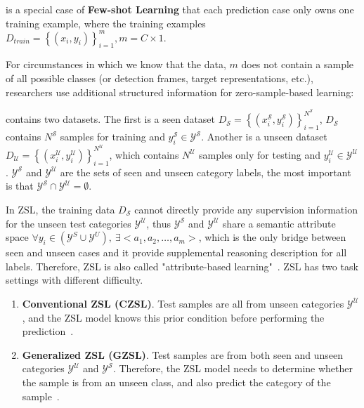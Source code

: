 \begin{definition}
is a special case of \textbf{Few-shot Learning} that each prediction case only owns one training example, where the training examples $D_{train} = \left\{(x_i, y_i) \right\}_{i=1}^{m}, m = C \times 1$.
\end{definition}
For circumstances in which we know that the data, $m$ does not contain a sample of all possible classes (or detection frames, target representations, etc.), researchers use additional structured information for zero-sample-based learning:
\begin{definition}
contains two datasets. The first is a seen dataset $D_{\mathcal{S}} = \left\{ (x_i^{\mathcal{S}}, y_i^{\mathcal{S}}) \right\}_{i=1}^{N^{\mathcal{S}}}$, $D_{\mathcal{S}}$ contains $N^{\mathcal{S}}$ samples for training and $y_i^{\mathcal{S}} \in \mathcal{Y}^{\mathcal{S}}$. Another is a unseen dataset $D_{\mathcal{U}} = \left\{ (x_i^{\mathcal{U}}, y_i^{\mathcal{U}}) \right\}_{i=1}^{N^{\mathcal{U}}}$, which contains $N^{\mathcal{U}}$ samples only for testing and $y_i^{\mathcal{U}} \in \mathcal{Y}^{\mathcal{U}}$. $\mathcal{Y}^{\mathcal{S}}$ and $\mathcal{Y}^{\mathcal{U}}$ are the sets of seen and unseen category labels, the most important is that $\mathcal{Y}^{\mathcal{S}} \cap \mathcal{Y}^{\mathcal{U}} = \emptyset$.
\end{definition}
In ZSL, the training data $D_{\mathcal{S}}$ cannot directly provide any supervision information for the unseen test categories $\mathcal{Y}^{\mathcal{U}}$, thus $\mathcal{Y}^{\mathcal{S}}$ and $\mathcal{Y}^{\mathcal{U}}$ share a semantic attribute space $\forall y_{i} \in \left( \mathcal{Y}^{S} \cup \mathcal{Y}^{U} \right), \ \exists <a_{1}, a_{2}, \dots, a_{m}>$, which is the only bridge between seen and unseen cases and it provide supplemental reasoning description for all labels. Therefore, ZSL is also called "attribute-based learning"~.
ZSL has two task settings with different difficulty.
\begin{enumerate}
    \item \textbf{Conventional ZSL (CZSL)}. Test samples are all from unseen categories $\mathcal{Y}^{\mathcal{U}}$, and the ZSL model knows this prior condition before performing the prediction~.
    \item \textbf{Generalized ZSL (GZSL)}. Test samples are from both seen and unseen categories $\mathcal{Y}^{\mathcal{U}}$ and $\mathcal{Y}^{\mathcal{S}}$. Therefore, the ZSL model needs to determine whether the sample is from an unseen class, and also predict the category of the sample~.
\end{enumerate}

